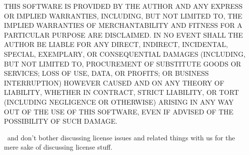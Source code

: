 \start \txx \blue
THIS SOFTWARE IS PROVIDED BY THE AUTHOR  AND ANY EXPRESS OR
IMPLIED WARRANTIES, INCLUDING, BUT NOT LIMITED TO, THE IMPLIED WARRANTIES
OF MERCHANTABILITY AND FITNESS FOR A PARTICULAR PURPOSE ARE DISCLAIMED.
IN NO EVENT SHALL THE AUTHOR BE LIABLE FOR ANY DIRECT, INDIRECT,
INCIDENTAL, SPECIAL, EXEMPLARY, OR CONSEQUENTIAL DAMAGES (INCLUDING, BUT
NOT LIMITED TO, PROCUREMENT OF SUBSTITUTE GOODS OR SERVICES; LOSS OF USE,
DATA, OR PROFITS; OR BUSINESS INTERRUPTION) HOWEVER CAUSED AND ON ANY
THEORY OF LIABILITY, WHETHER IN CONTRACT, STRICT LIABILITY, OR TORT
(INCLUDING NEGLIGENCE OR OTHERWISE) ARISING IN ANY WAY OUT OF THE USE OF
THIS SOFTWARE, EVEN IF ADVISED OF THE POSSIBILITY OF SUCH DAMAGE.
\stop

\unknown\ and don't bother discussing license issues and related things with us
for the mere sake of discussing license stuff.

\stopsubject

\stopdocument
